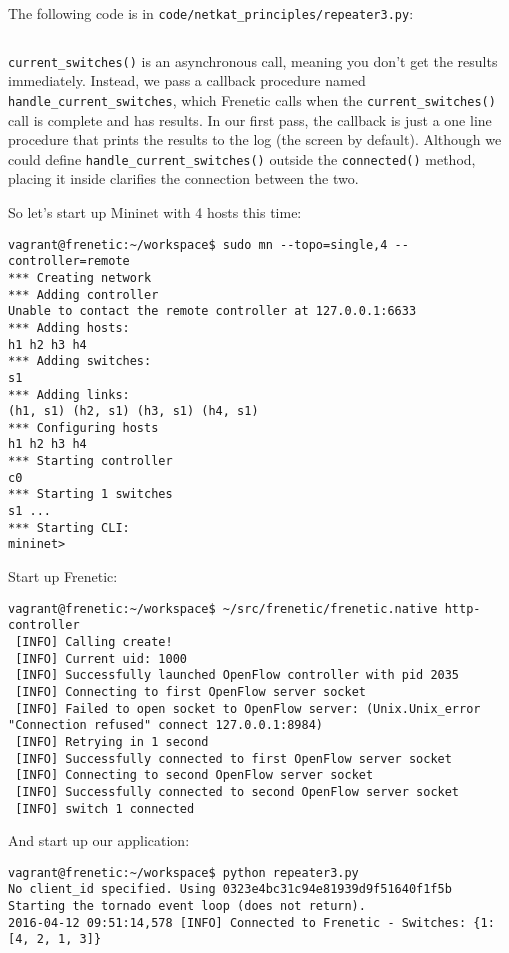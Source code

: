 The following code is in \texttt{code/netkat\_principles/repeater3.py}:

\inputminted{python}{code/netkat_principles/repeater3.py}

\texttt{current\_switches()} is an asynchronous call, meaning you don't get the results immediately.
Instead, we pass a callback procedure named \texttt{handle\_current\_switches}, which Frenetic calls
when the \texttt{current\_switches()} call is complete and has results.  In our first pass, the callback
is just a one line procedure that prints the results to the log (the screen by default).  Although
we could define \texttt{handle\_current\_switches()} outside the \texttt{connected()} method, placing
it inside clarifies the connection between the two.  

So let's start up Mininet with 4 hosts this time:

\begin{verbatim}
vagrant@frenetic:~/workspace$ sudo mn --topo=single,4 --controller=remote
*** Creating network
*** Adding controller
Unable to contact the remote controller at 127.0.0.1:6633
*** Adding hosts:
h1 h2 h3 h4
*** Adding switches:
s1
*** Adding links:
(h1, s1) (h2, s1) (h3, s1) (h4, s1)
*** Configuring hosts
h1 h2 h3 h4
*** Starting controller
c0
*** Starting 1 switches
s1 ...
*** Starting CLI:
mininet>
\end{verbatim}

Start up Frenetic:

\begin{verbatim}
vagrant@frenetic:~/workspace$ ~/src/frenetic/frenetic.native http-controller
 [INFO] Calling create!
 [INFO] Current uid: 1000
 [INFO] Successfully launched OpenFlow controller with pid 2035
 [INFO] Connecting to first OpenFlow server socket
 [INFO] Failed to open socket to OpenFlow server: (Unix.Unix_error "Connection refused" connect 127.0.0.1:8984)
 [INFO] Retrying in 1 second
 [INFO] Successfully connected to first OpenFlow server socket
 [INFO] Connecting to second OpenFlow server socket
 [INFO] Successfully connected to second OpenFlow server socket
 [INFO] switch 1 connected
\end{verbatim}

And start up our application:

\begin{verbatim}
vagrant@frenetic:~/workspace$ python repeater3.py
No client_id specified. Using 0323e4bc31c94e81939d9f51640f1f5b
Starting the tornado event loop (does not return).
2016-04-12 09:51:14,578 [INFO] Connected to Frenetic - Switches: {1: [4, 2, 1, 3]}
\end{verbatim}


